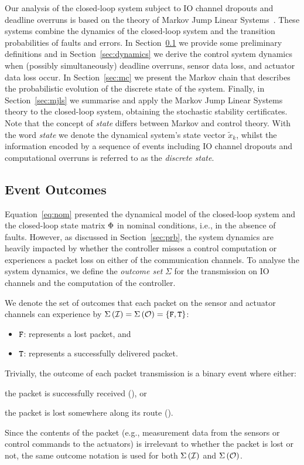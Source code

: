 Our analysis of the closed-loop system subject to IO channel dropouts and deadline overruns is based on the theory of Markov Jump Linear Systems~\cite{Costa:2005}.
These systems combine the dynamics of the closed-loop system and the transition probabilities of faults and errors.
In Section~\ref{sec:prel} we provide some preliminary definitions and in Section~\ref{sec:dynamics} we derive the control system dynamics when (possibly simultaneously) deadline overruns, sensor data loss, and actuator data loss occur.
In Section~\ref{sec:mc} we present the Markov chain that describes the probabilistic evolution of the discrete state of the system.
Finally, in Section~\ref{sec:mjls} we summarise and apply the Markov Jump Linear Systems theory to the closed-loop system, obtaining the stochastic stability certificates.
Note that the concept of \emph{state} differs between Markov and control theory.
With the word \emph{state} we denote the dynamical system's state vector $\tilde{x}_k$, whilst the information encoded by a sequence of events including IO channel dropouts and computational overruns is referred to as the \emph{discrete state}.

\subsection{Event Outcomes}%
\label{sec:prel}%

Equation~\eqref{eq:nom} presented the dynamical model of the closed-loop system and the closed-loop state matrix $\Phi$ in nominal conditions, i.e., in the absence of faults.
However, as discussed in Section~\ref{sec:prb}, the system dynamics are heavily impacted by whether the controller misses a control computation or experiences a packet loss on either of the communication channels.
To analyse the system dynamics, we define the \emph{outcome set} $\Sigma$ for the transmission on IO channels and the computation of the controller.
\begin{definition}%
    \label{def:comm}%
    We denote the set of outcomes that each packet on the sensor and actuator channels can experience by $\Sigma\left( \mathcal{I} \right) = \Sigma\left( \mathcal{O} \right) = \left\{ \texttt{F}, \texttt{T} \right\}$:
    \begin{itemize}
        \item $\texttt{F}$: represents a lost packet, and
        \item $\texttt{T}$: represents a successfully delivered packet.
    \end{itemize}
\end{definition}
%
Trivially, the outcome of each packet transmission is a binary event where either:
\begin{enumerate*}[label=(\roman*)]
    \item the packet is successfully received (\cT), or
    \item the packet is lost somewhere along its route (\cF).
\end{enumerate*}
Since the contents of the packet (e.g., measurement data from the sensors or control commands to the actuators) is irrelevant to whether the packet is lost or not, the same outcome notation is used for both $\Sigma\left( \mathcal{I} \right)$ and $\Sigma\left( \mathcal{O} \right)$.

